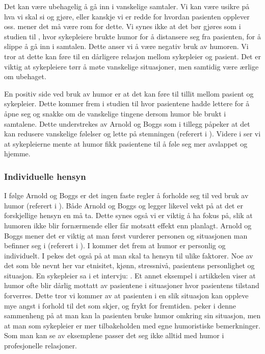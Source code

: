 Det kan være ubehagelig å gå inn i vanskelige samtaler. Vi kan være usikre på
hva vi skal si og gjøre, eller kanskje vi er redde for hvordan pasienten
opplever oss.  mener det må være rom for dette.
Vi synes ikke at det bør gjøres som i studien til , hvor
sykepleiere brukte humor for å distansere seg fra pasienten, for å slippe å gå
inn i samtalen.  Dette anser vi å være negativ bruk av humoren. Vi tror at
dette kan føre til en dårligere relasjon mellom sykepleier og pasient. Det er
viktig at sykepleiere tørr å møte vanskelige situasjoner, men samtidig være
ærlige om ubehaget.

En positiv side ved bruk av humor er at det kan føre til tillit mellom pasient
og sykepleier. Dette kommer frem i studien til  hvor
pasientene hadde lettere for å åpne seg og snakke om de vanskelige tingene
dersom humor ble brukt i samtalene. Dette understrekes av Arnold og Boggs som
i tillegg påpeker at det kan redusere vanskelige følelser og lette på
stemningen (referert i ). Videre i  ser vi at
sykepleierne mente at humor fikk pasientene til å føle seg mer avslappet og
hjemme.

\subsubsection{Individuelle hensyn}

I følge Arnold og Boggs er det ingen faste regler å forholde seg til ved bruk
av humor (referert i ). Både Arnold og Boggs og
 legger likevel vekt på at det er forskjellige hensyn en må
ta. Dette synes også vi er viktig å ha fokus på, slik at humoren ikke blir
fornærmende eller får motsatt effekt enn planlagt. Arnold og Boggs mener det
er viktig at man først vurderer personen og situasjonen man befinner seg i
(referert i ). I  kommer det frem at humor er
personlig og individuelt. I  pekes det også på at man skal ta
hensyn til ulike faktorer. Noe av det som ble nevnt her var etnisitet, kjønn,
stressnivå, pasientens personlighet og situasjon. En sykepleier sa i et
intervju: . Et annet eksempel i artikkelen viser at humor ofte blir
dårlig mottatt av pasientene i situasjoner hvor pasientens tilstand forverres.
Dette tror vi kommer av at pasienten i en slik situasjon kan oppleve mye angst
i forhold til det som skjer, og frykt for fremtiden.  peker i
denne sammenheng på at man kan la pasienten bruke humor omkring sin situasjon,
men at man som sykepleier er mer tilbakeholden med egne humoristiske
bemerkninger. Som man kan se av eksemplene passer det seg ikke alltid med humor
i profesjonelle relasjoner.

